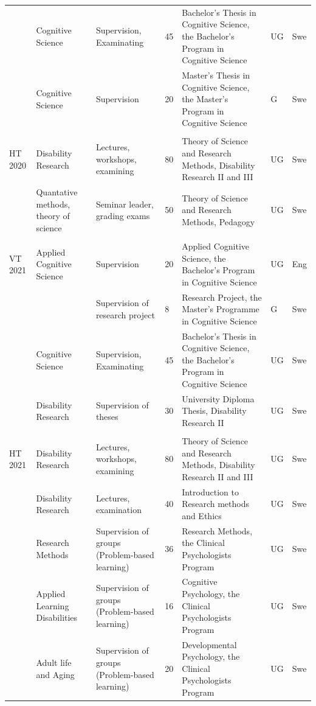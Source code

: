 \documentclass[]{article}
\begin{document}
\begin{landscape}
\begin{ThreePartTable}
\begin{longtable}[t]{l>{\raggedright\arraybackslash}p{5cm}>{\raggedright\arraybackslash}p{5cm}l>{\raggedright\arraybackslash}p{5cm}ll}
 & Cognitive Science & Supervision, Examinating & 45 & Bachelor's Thesis in Cognitive Science, the Bachelor's Program in Cognitive Science & UG & \vphantom{2} Swe\\
\addlinespace
 & Cognitive Science & Supervision & 20 & Master's Thesis in Cognitive Science, the Master's Program in Cognitive Science & G & Swe\\
 &  &  &  &  &  \vphantom{8} & \\
HT 2020 & Disability Research & Lectures, workshops, examining & 80 & Theory of Science and Research Methods, Disability Research II and III & UG & Swe\\
 & Quantative methods, theory of science & Seminar leader, grading exams & 50 & Theory of Science and Research Methods, Pedagogy & UG & Swe\\
 &  &  &  &  &  \vphantom{7} & \\
\addlinespace
VT 2021 & Applied Cognitive Science & Supervision & 20 & Applied Cognitive Science, the Bachelor's Program in Cognitive Science & UG & Eng\\
 &  & Supervision of research project & 8 & Research Project, the Master's Programme in Cognitive Science & G & Swe\\
 & Cognitive Science & Supervision, Examinating & 45 & Bachelor's Thesis in Cognitive Science, the Bachelor's Program in Cognitive Science & UG & \vphantom{1} Swe\\
 & Disability Research & Supervision of theses & 30 & University Diploma Thesis, Disability Research II & UG & Swe\\
 &  &  &  &  &  \vphantom{6} & \\
\addlinespace
HT 2021 & Disability Research & Lectures, workshops, examining & 80 & Theory of Science and Research Methods, Disability Research II and III & UG & Swe\\
 & Disability Research & Lectures, examination & 40 & Introduction to Research methods and Ethics & UG & Swe\\
 & Research Methods & Supervision of groups (Problem-based learning) & 36 & Research Methods, the Clinical Psychologists Program & UG & Swe\\
 & Applied Learning Disabilities & Supervision of groups (Problem-based learning) & 16 & Cognitive Psychology, the Clinical Psychologists Program & UG & Swe\\
 & Adult life and Aging & Supervision of groups (Problem-based learning) & 20 & Developmental Psychology, the Clinical Psychologists Program & UG & Swe\\

\end{longtable}
\end{ThreePartTable}
\end{landscape}
\end{document}
